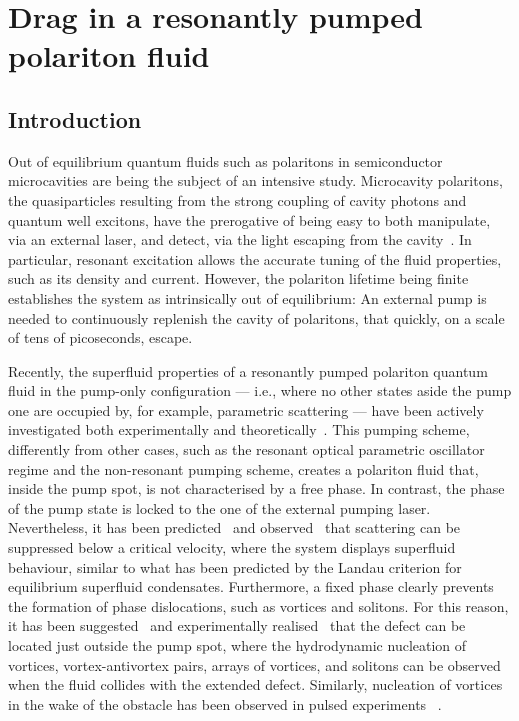 

\chapter{Drag in a resonantly pumped polariton fluid}
\label{cha:drag}

\section{Introduction}
\label{sec:intro}

Out of equilibrium quantum fluids such as polaritons in semiconductor
microcavities are being the subject of an intensive study. Microcavity
polaritons, the quasiparticles resulting from the strong coupling of
cavity photons and quantum well excitons, have the prerogative of
being easy to both manipulate, via an external laser, and detect, via
the light escaping from the cavity~\cite{9780199228942}. In
particular, resonant excitation allows the accurate tuning of the
fluid properties, such as its density and current. However, the
polariton lifetime being finite establishes the system as
intrinsically out of equilibrium: An external pump is needed to
continuously replenish the cavity of polaritons, that quickly, on a
scale of tens of picoseconds, escape.

Recently, the superfluid properties of a resonantly pumped polariton
quantum fluid in the pump-only configuration --- i.e., where no other
states aside the pump one are occupied by, for example, parametric
scattering --- have been actively investigated both experimentally and
theoretically~\cite{Carusotto_2004,Ciuti_2005,Amo_2009,Cancellieri_2010,Pigeon_2011,Amo_2011,Nardin_2011,Sanvitto_2011}. This
pumping scheme, differently from other cases, such as the resonant
optical parametric oscillator regime and the non-resonant pumping
scheme, creates a polariton fluid that, inside the pump spot, is not
characterised by a free phase. In contrast, the phase of the pump
state is locked to the one of the external pumping
laser. Nevertheless, it has been
predicted~\cite{Carusotto_2004,Ciuti_2005} and
observed~\cite{Amo_2009} that scattering can be suppressed below a
critical velocity, where the system displays superfluid behaviour,
similar to what has been predicted by the Landau criterion for
equilibrium superfluid condensates. Furthermore, a fixed phase clearly
prevents the formation of phase dislocations, such as vortices and
solitons. For this reason, it has been suggested~\cite{Pigeon_2011}
and experimentally realised~\cite{Amo_2011} that the defect can be
located just outside the pump spot, where the hydrodynamic nucleation
of vortices, vortex-antivortex pairs, arrays of vortices, and solitons
can be observed when the fluid collides with the extended
defect. Similarly, nucleation of vortices in the wake of the obstacle
has been observed in pulsed experiments
~\cite{Nardin_2011,Sanvitto_2011}.

